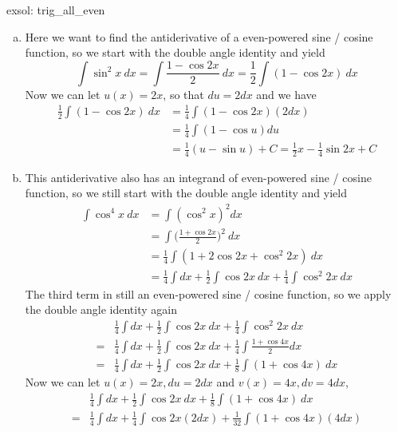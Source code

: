 \begin{exsol}[]{exsol: trig_all_even}
    \begin{enumerate}[a)]
        \item Here we want to find the antiderivative of a even-powered sine / cosine function, so we start with the double angle identity and yield
        \[\int \sin^2x~dx = \int \frac{1-\cos 2x}{2}~dx = \frac{1}{2}\int (1-\cos 2x)~dx\]
        Now we can let $u(x) = 2x$, so that $du = 2dx$ and we have
        \begin{align*}
            \frac{1}{2}\int (1-\cos 2x)~dx &= \frac{1}{4}\int (1-\cos 2x) (2dx)\\
            &= \frac{1}{4}\int (1-\cos u) du\\
            &= \frac{1}{4}(u-\sin u) + C = \frac{1}{2}x - \frac{1}{4} \sin 2x + C
        \end{align*}
        \item This antiderivative also has an integrand of even-powered sine / cosine function, so we still start with the double angle identity and yield
        \begin{align*}
            \int \cos^4x~dx &= \int (\cos^2x)^2 dx\\
            &= \int \Big(\frac{1 + \cos 2x}{2}\Big)^2~dx\\
            &= \frac{1}{4}\int (1 + 2\cos 2x + \cos^2 2x)~dx \\
            &= \frac{1}{4}\int dx + \frac{1}{2}\int \cos 2x~dx + \frac{1}{4}\int \cos^2 2x~dx
        \end{align*}
        The third term in still an even-powered sine / cosine function, so we apply the double angle identity again
        \begin{align*}
            &\frac{1}{4}\int dx + \frac{1}{2}\int \cos 2x~dx + \frac{1}{4}\int \cos^2 2x~dx\\
            = &\frac{1}{4}\int dx + \frac{1}{2}\int \cos 2x~dx + \frac{1}{4}\int \frac{1 + \cos 4x}{2}dx\\
            = &\frac{1}{4}\int dx + \frac{1}{2}\int \cos 2x~dx + \frac{1}{8}\int (1+\cos 4x)~dx
        \end{align*}
        Now we can let $u(x) = 2x, du = 2dx$ and $v(x) = 4x, dv = 4dx$,
        \begin{align*}
            &\frac{1}{4}\int dx + \frac{1}{2}\int \cos 2x~dx + \frac{1}{8}\int (1+\cos 4x)~dx\\
            =&\frac{1}{4}\int dx + \frac{1}{4}\int \cos 2x(2dx) + \frac{1}{32}\int (1+\cos 4x)(4dx)\\

\end{align*}
\end{enumerate}
\end{exsol}
